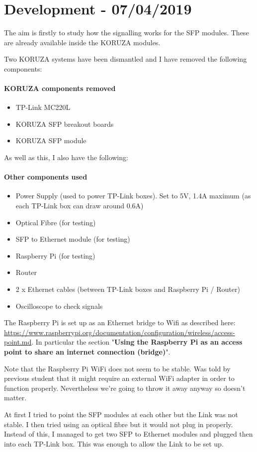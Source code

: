 \section{Development - 07/04/2019}
The aim is firstly to study how the signalling works for the \ac{SFP}
modules. These are already available inside the KORUZA modules.

Two KORUZA systems have been dismantled and I have removed the following
components:

\paragraph{\textbf{KORUZA components removed}}
\begin{itemize}
\item{TP-Link MC220L}
\item{KORUZA \ac{SFP} breakout boards}
\item{KORUZA \ac{SFP} module}
\end{itemize}

As well as this, I also have the following:

\paragraph{\textbf{Other components used}}
\begin{itemize}
\item{Power Supply (used to power TP-Link boxes). Set to 5V, 1.4A maximum
(as each TP-Link box can draw around 0.6A)}
\item{Optical Fibre (for testing)}
\item{\ac{SFP} to Ethernet module (for testing)}
\item{Raspberry Pi (for testing)}
\item{Router}
\item{2 x Ethernet cables (between TP-Link boxes and Raspberry Pi / Router)}
\item{Oscilloscope to check signals}
\end{itemize}

The Raspberry Pi is set up as an Ethernet bridge to Wifi as described here:
\url{https://www.raspberrypi.org/documentation/configuration/wireless/access-point.md}.
In particular the section "\textbf{Using the Raspberry Pi as an access
point to share an internet connection (bridge)}".

Note that the Raspberry Pi WiFi does not seem to be stable. Was told by previous
student that it might require an external WiFi adapter in order to function
properly. Nevertheless we're going to throw it away anyway so doesn't matter.

At first I tried to point the \ac{SFP} modules at each other but the Link was
not stable. I then tried using an optical fibre but it would not plug in
properly. Instead of this, I managed to get two \ac{SFP} to Ethernet modules
and plugged then into each TP-Link box. This was enough to allow the Link
to be set up.

